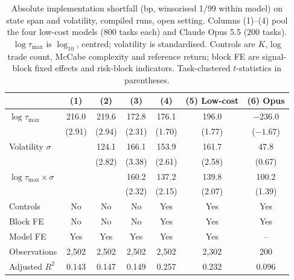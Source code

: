 \documentclass[a4paper,fleqn]{cas-sc}
\begin{document}
\begin{table}[width=\linewidth,cols=7,pos=t]
\caption{Absolute implementation shortfall (bp, winsorised 1/99 within model) on state span and volatility, compiled runs, open setting. Columns (1)--(4) pool the four low-cost models (800 tasks each) and Claude Opus 5.5 (200 tasks). $\log\tau_{\max}$ is $\log_{10}$, centred; volatility is standardised. Controls are $K$, log trade count, McCabe complexity and reference return; block FE are signal-block fixed effects and risk-block indicators. Task-clustered $t$-statistics in parentheses.}
\label{tab:reg}
\begin{tabular*}{\tblwidth}{@{} LCCCCCC@{} }
\toprule
 & (1) & (2) & (3) & (4) & (5) Low-cost & (6) Opus \\
\midrule
$\log\tau_{\max}$               & 216.0  & 219.6  & 172.8  & 176.1  & 196.0  & $-236.0$ \\
                                & (2.91) & (2.94) & (2.31) & (1.70) & (1.77) & ($-1.67$) \\
Volatility $\sigma$             &        & 124.1  & 166.1  & 153.9  & 161.7  & 47.8 \\
                                &        & (2.82) & (3.38) & (2.61) & (2.58) & (0.67) \\
$\log\tau_{\max}\times\sigma$   &        &        & 160.2  & 137.2  & 139.8  & 100.2 \\
                                &        &        & (2.32) & (2.15) & (2.07) & (1.39) \\
\midrule
Controls          & No & No & No & Yes & Yes & Yes \\
Block FE          & No & No & No & Yes & Yes & Yes \\
Model FE          & Yes & Yes & Yes & Yes & Yes & -- \\
Observations      & 2{,}502 & 2{,}502 & 2{,}502 & 2{,}502 & 2{,}302 & 200 \\
Adjusted $R^2$    & 0.143 & 0.147 & 0.149 & 0.257 & 0.232 & 0.096 \\
\bottomrule
\end{tabular*}
\end{table}
\end{document}

